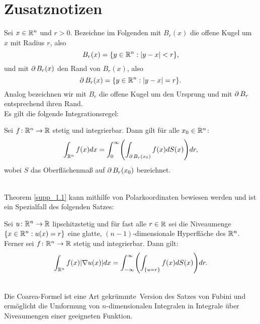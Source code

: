 \section{Zusatznotizen}
\label{sec:SuppNotes}
	Sei $x \in \mathbb{R}^n$ und $r > 0$. Bezeichne im Folgenden mit $B_r(x)$ die offene Kugel um $x$ mit Radius $r$, also
	\begin{equation}
		B_r(x) = \{ y \in \mathbb{R}^n : |y-x| < r \}, \label{supp_0.1}
	\end{equation}
	und mit $\operatorname{\partial} B_r(x)$ den Rand von $B_r(x)$, also
	\begin{equation}
		\operatorname{\partial} B_r(x) = \{ y \in \mathbb{R}^n : |y-x| = r \}. \label{supp_0.2}
	\end{equation}
	Analog bezeichnen wir mit $B_r$ die offene Kugel um den Ursprung und mit $\operatorname{\partial} B_r$ entsprechend ihren Rand. \\

	Es gilt die folgende Integrationsregel:
	
\begin{thm} \label{supp_1.1}
	Sei $f \colon \mathbb{R}^n \rightarrow \mathbb{R}$ stetig und integrierbar. Dann gilt für alle $x_0 \in \mathbb{R}^n$:
	\begin{equation}
		\int_{\RR^n} f(x) dx = \int_{0}^{\infty} \enbrace*{ \int_{\der B_r(x_0)}  f(x) dS(x) } dr, \label{supp_0.3}
	\end{equation}
	wobei $S$ das Oberflächenmaß auf $\operatorname{\partial} B_r(x_0)$ bezeichnet.
\end{thm}
	
\mbox{} \\
Theorem \ref{supp_1.1} kann mithilfe von Polarkoordinaten bewiesen werden und ist ein Spezialfall des folgenden Satzes:

\begin{thm} \label{supp_1.2}
	Sei $u \colon \mathbb{R}^n \rightarrow \mathbb{R}$ lipschitzstetig und für fast alle $r \in \mathbb{R}$ sei die Niveaumenge $\{x \in \mathbb{R}^n : u(x) = r\}$ eine glatte, $(n-1)$-dimensionale Hyperfläche des $\mathbb{R}^n$. Ferner sei $f \colon \mathbb{R}^n \rightarrow \mathbb{R}$ stetig und integrierbar. Dann gilt: 
	\begin{equation}
		\int_{\RR^n} f(x) |\nabla u(x)| dx = \int_{-\infty}^{\infty} \enbrace*{ \int_{ \{u = r\}} f(x) dS(x) } dr. \label{supp_0.4}
	\end{equation}
\end{thm}

\mbox{} \\
Die Coarea-Formel ist eine Art \glqq gekrümmte\grqq \ Version des Satzes von Fubini und ermöglicht die Umformung von $n$-dimensionalen Integralen in Integrale über Niveaumengen einer geeigneten Funktion.

